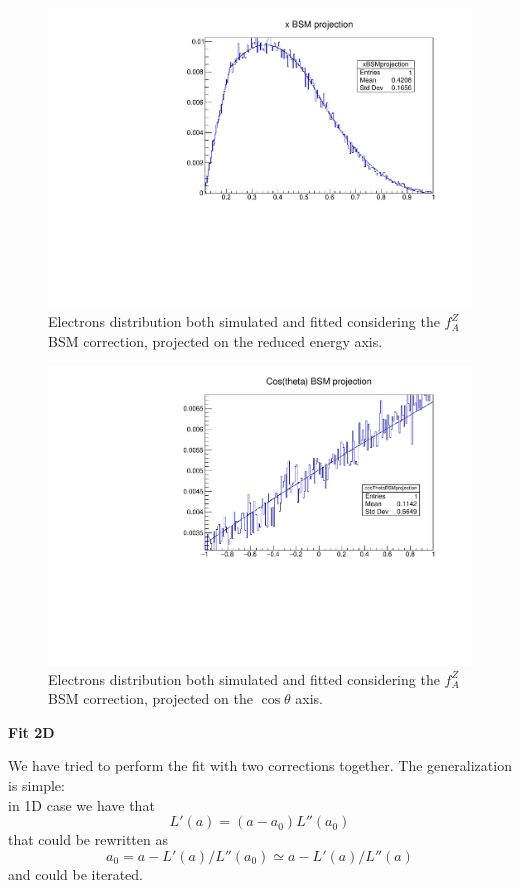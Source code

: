 \begin{figure} [htp]
\centering
\includegraphics[scale=0.7]{364x.pdf}
\caption{Electrons distribution both simulated and fitted considering the $f_A^Z$ BSM correction, projected on the reduced energy axis.}
\label{03_364x}
\end{figure}

\begin{figure} [htp]
\centering
\includegraphics[scale=0.7]{364cosTheta.pdf}
\caption{Electrons distribution both simulated and fitted considering the $f_A^Z$ BSM correction, projected on the $\cos\theta$ axis.}
\label{03_364cosTheta}
\end{figure}

\textbf{Fit 2D}

We have tried to perform the fit with two corrections together. The generalization is simple: \\
in 1D case we have that 
\[ L'(a)=(a-a_0)L''(a_0)\]
that could be rewritten as \[a_0=a- L'(a)/L''(a_0) \simeq a- L'(a)/L''(a) \]
and could be iterated.

